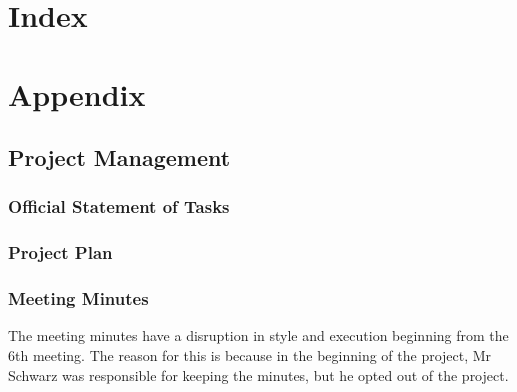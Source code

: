 \documentclass[10pt,a4paper,titlepage,twoside,english,final]{zhawreprt}
\begin{document}
\chapter{Index}\label{chp:Index}
\label{sec:Bibliography}
\newpage
\printglossary\label{sec:Glossary}
\newpage
\listoffigures\label{sec:ListOfFigures}
\newpage
\lstlistoflistings\label{sec:ListOfListings}
\newpage
\printglossary[title=SymbolGlossary,type=symbols]\label{sec:SymbolGlossary}
\newpage
\printglossary[title=Acronym Glossary,type=\acronymtype]\label{sec:AcronymGlossary}
\newpage
\printindex\label{sec:Index}

\appendix
\chapter{Appendix}\label{chp:Appendix}
\section{Project Management}\label{sec:ProjectManagement}

\subsection{Official Statement of Tasks}\label{ssec:OfficialStatementOfTasks}

\subsection{Project Plan}\label{ssec:ProjectPlan}


\subsection{Meeting Minutes}\label{ssec:MeetingMinutes}
The meeting minutes have a disruption in style and execution beginning from the 6th meeting.
The reason for this is because in the beginning of the project, Mr Schwarz was responsible for keeping the minutes, but he opted out of the project.











\end{document}
